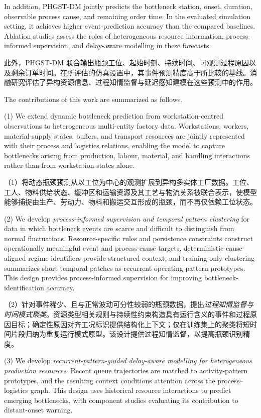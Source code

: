 \documentclass[a4paper,fleqn]{cas-dc}
\newcommand{\zhpara}[1]{%
  \par\begingroup\small\color{black!72}\noindent #1\par\endgroup}
\begin{document}
In addition, PHGST-DM jointly predicts the bottleneck station, onset, duration, observable process cause, and remaining order time. In the evaluated simulation setting, it achieves higher event-prediction accuracy than the compared baselines. Ablation studies assess the roles of heterogeneous resource information, process-informed supervision, and delay-aware modelling in these forecasts.

\zhpara{此外，PHGST-DM 联合输出瓶颈工位、起始时刻、持续时间、可观测过程原因以及剩余订单时间。在所评估的仿真设置中，其事件预测精度高于所比较的基线。消融研究评估了异构资源信息、过程知情监督与延迟感知建模在这些预测中的作用。}


The contributions of this work are summarized as follows.

(1) We extend dynamic bottleneck prediction from workstation-centred observations to heterogeneous multi-entity factory data. Workstations, workers, material-supply states, buffers, and transport resources are jointly represented with their process and logistics relations, enabling the model to capture bottlenecks arising from production, labour, material, and handling interactions rather than from workstation states alone.

\zhpara{（1）将动态瓶颈预测从以工位为中心的观测扩展到异构多实体工厂数据。工位、工人、物料供给状态、缓冲区和运输资源及其工艺与物流关系被联合表示，使模型能够捕捉由生产、劳动力、物料和搬运交互形成的瓶颈，而不再仅依赖工位状态。}


(2) We develop \emph{process-informed supervision and temporal pattern clustering} for data in which bottleneck events are scarce and difficult to distinguish from normal fluctuations. Resource-specific rules and persistence constraints construct operationally meaningful event and process-cause targets, deterministic cause-aligned regime identifiers provide structured context, and training-only clustering summarizes short temporal patches as recurrent operating-pattern prototypes. This design provides process-informed supervision for improving bottleneck-identification accuracy.

\zhpara{（2）针对事件稀少、且与正常波动可分性较弱的瓶颈数据，提出\emph{过程知情监督与时间模式聚类}。资源类型相关规则与持续性约束构造具有运行含义的事件和过程原因目标；确定性原因对齐工况标识提供结构化上下文；仅在训练集上的聚类将短时间片段归纳为重复运行模式原型。该设计提供过程知情监督，以提高瓶颈识别精度。}


(3) We develop \emph{recurrent-pattern-guided delay-aware modelling for heterogeneous production resources}. Recent queue trajectories are matched to activity-pattern prototypes, and the resulting context conditions attention across the process--logistics graph. This design uses historical resource interactions to predict emerging bottlenecks, with component studies evaluating its contribution to distant-onset warning.
\end{document}
